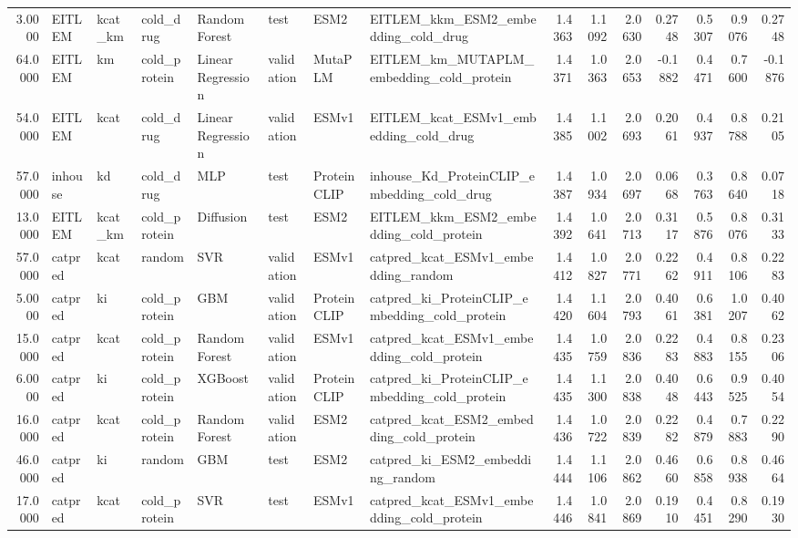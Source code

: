 \begin{tabular}{rlllllllrrrrrrr}
3.0000 & EITLEM & kcat_km & cold_drug & Random Forest & test & ESM2 & EITLEM_kkm_ESM2_embedding_cold_drug & 1.4363 & 1.1092 & 2.0630 & 0.2748 & 0.5307 & 0.9076 & 0.2748 \\
64.0000 & EITLEM & km & cold_protein & Linear Regression & validation & MutaPLM & EITLEM_km_MUTAPLM_embedding_cold_protein & 1.4371 & 1.0363 & 2.0653 & -0.1882 & 0.4471 & 0.7600 & -0.1876 \\
54.0000 & EITLEM & kcat & cold_drug & Linear Regression & validation & ESMv1 & EITLEM_kcat_ESMv1_embedding_cold_drug & 1.4385 & 1.1002 & 2.0693 & 0.2061 & 0.4937 & 0.8788 & 0.2105 \\
57.0000 & inhouse & kd & cold_drug & MLP & test & ProteinCLIP & inhouse_Kd_ProteinCLIP_embedding_cold_drug & 1.4387 & 1.0934 & 2.0697 & 0.0668 & 0.3763 & 0.8640 & 0.0718 \\
13.0000 & EITLEM & kcat_km & cold_protein & Diffusion & test & ESM2 & EITLEM_kkm_ESM2_embedding_cold_protein & 1.4392 & 1.0641 & 2.0713 & 0.3117 & 0.5876 & 0.8076 & 0.3133 \\
57.0000 & catpred & kcat & random & SVR & validation & ESMv1 & catpred_kcat_ESMv1_embedding_random & 1.4412 & 1.0827 & 2.0771 & 0.2262 & 0.4911 & 0.8106 & 0.2283 \\
5.0000 & catpred & ki & cold_protein & GBM & validation & ProteinCLIP & catpred_ki_ProteinCLIP_embedding_cold_protein & 1.4420 & 1.1604 & 2.0793 & 0.4061 & 0.6381 & 1.0207 & 0.4062 \\
15.0000 & catpred & kcat & cold_protein & Random Forest & validation & ESMv1 & catpred_kcat_ESMv1_embedding_cold_protein & 1.4435 & 1.0759 & 2.0836 & 0.2283 & 0.4883 & 0.8155 & 0.2306 \\
6.0000 & catpred & ki & cold_protein & XGBoost & validation & ProteinCLIP & catpred_ki_ProteinCLIP_embedding_cold_protein & 1.4435 & 1.1300 & 2.0838 & 0.4048 & 0.6443 & 0.9525 & 0.4054 \\
16.0000 & catpred & kcat & cold_protein & Random Forest & validation & ESM2 & catpred_kcat_ESM2_embedding_cold_protein & 1.4436 & 1.0722 & 2.0839 & 0.2282 & 0.4879 & 0.7883 & 0.2290 \\
46.0000 & catpred & ki & random & GBM & test & ESM2 & catpred_ki_ESM2_embedding_random & 1.4444 & 1.1106 & 2.0862 & 0.4660 & 0.6858 & 0.8938 & 0.4664 \\
17.0000 & catpred & kcat & cold_protein & SVR & test & ESMv1 & catpred_kcat_ESMv1_embedding_cold_protein & 1.4446 & 1.0841 & 2.0869 & 0.1910 & 0.4451 & 0.8290 & 0.1930 \\

\end{tabular}
